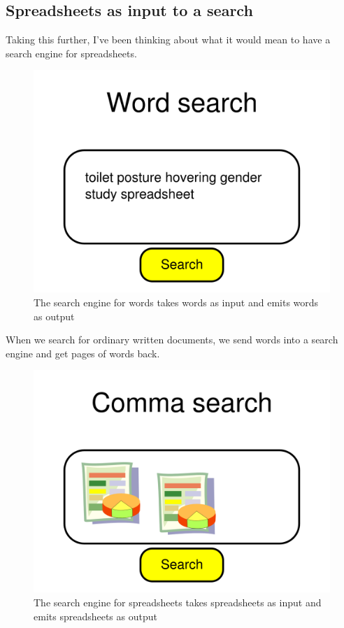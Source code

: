 \documentclass{acm_proc_article-sp}
\begin{document}
\subsection{Spreadsheets as input to a search}
Taking this further, I've been thinking
about what it would mean to have a search engine for spreadsheets.

\begin{figure}
\includegraphics[width=\columnwidth]{../pagerank-for-spreadsheets/wordsearch.png}
\caption{The search engine for words takes words as input and emits words as output}
\centering
\end{figure}

When we search for ordinary written documents, we send words into a search
engine and get pages of words back.

\begin{figure}
\includegraphics[width=\columnwidth]{../pagerank-for-spreadsheets/commasearch.png}
\caption{The search engine for spreadsheets takes spreadsheets as input and emits spreadsheets as output}
\centering
\end{figure}
\end{document}
